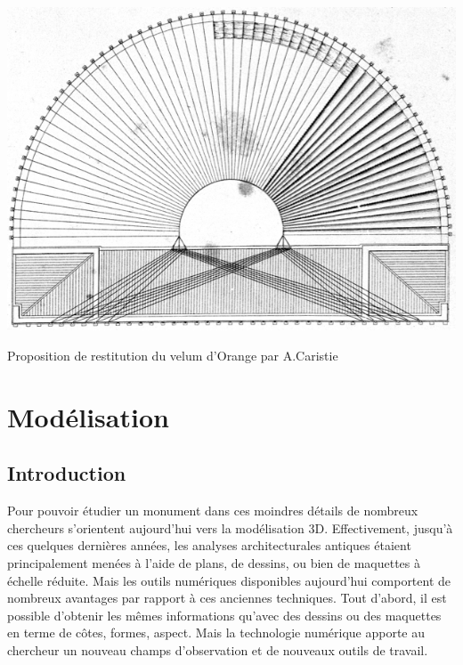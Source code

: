 \begin{figureth}
		\includegraphics[width=\linewidth]{images/velumCaristie}
		\caption[Velum]{Proposition de restitution du velum d'Orange par A.Caristie}
		\label{velumCaristie}
\end{figureth}		















\chapter{Modélisation}
		\minitoc
		\newpage
		
		\section{Introduction}
		Pour pouvoir étudier un monument dans ces moindres détails de nombreux chercheurs s'orientent aujourd'hui vers la modélisation 3D. Effectivement, jusqu'à ces quelques dernières années, les analyses architecturales antiques étaient principalement menées à l'aide de plans, de dessins, ou bien de maquettes à échelle réduite. Mais les outils numériques disponibles aujourd'hui comportent de nombreux avantages par rapport à ces anciennes techniques. Tout d'abord, il est possible d'obtenir les mêmes informations qu'avec des dessins ou des maquettes en terme de côtes, formes, aspect. Mais la technologie numérique apporte au chercheur un nouveau champs d'observation et de nouveaux outils de travail. 
		
